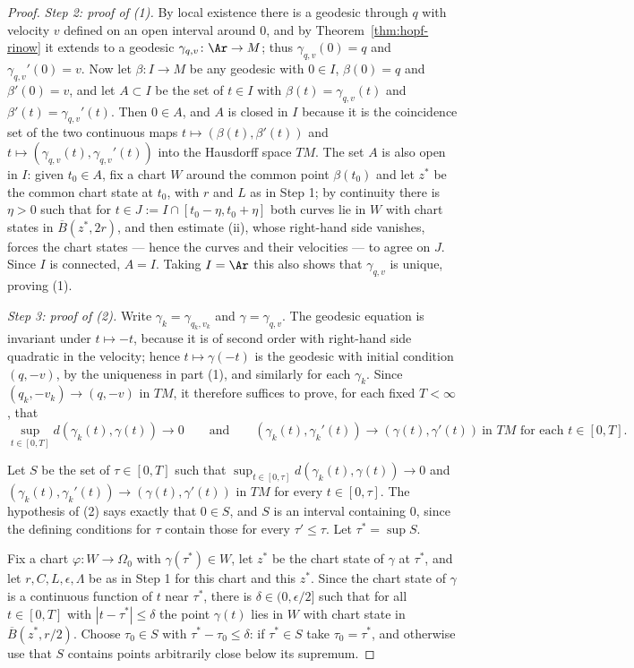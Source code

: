 \begin{proof}
{\em Step 2: proof of (1).} By local existence there is a geodesic
through $q$ with velocity $v$ defined on an open interval around $0$,
and by Theorem~\ref{thm:hopf-rinow} it extends to a geodesic
$\gamma_{q,v}\colon\Ar\to M$; thus $\gamma_{q,v}(0)=q$ and
$\gamma_{q,v}'(0)=v$. Now let $\beta\colon I\to M$ be any geodesic
with $0\in I$, $\beta(0)=q$ and $\beta'(0)=v$, and let $A\subset I$
be the set of $t\in I$ with $\beta(t)=\gamma_{q,v}(t)$ and
$\beta'(t)=\gamma_{q,v}'(t)$. Then $0\in A$, and $A$ is closed in $I$
because it is the coincidence set of the two continuous maps
$t\mapsto(\beta(t),\beta'(t))$ and
$t\mapsto(\gamma_{q,v}(t),\gamma_{q,v}'(t))$ into the Hausdorff space
$TM$. The set $A$ is also open in $I$: given $t_0\in A$, fix a chart
$W$ around the common point $\beta(t_0)$ and let $z^*$ be the common
chart state at $t_0$, with $r$ and $L$ as in Step 1; by continuity
there is $\eta>0$ such that for $t\in J:=I\cap[t_0-\eta,t_0+\eta]$
both curves lie in $W$ with chart states in $\overline{B}(z^*,2r)$,
and then estimate (ii), whose right-hand side vanishes, forces the
chart states --- hence the curves and their velocities --- to agree
on $J$. Since $I$ is connected, $A=I$. Taking $I=\Ar$ this also shows
that $\gamma_{q,v}$ is unique, proving (1).

{\em Step 3: proof of (2).} Write $\gamma_k=\gamma_{q_k,v_k}$ and
$\gamma=\gamma_{q,v}$. The geodesic equation is invariant under
$t\mapsto-t$, because it is of second order with right-hand side
quadratic in the velocity; hence $t\mapsto\gamma(-t)$ is the geodesic
with initial condition $(q,-v)$, by the uniqueness in part (1), and
similarly for each $\gamma_k$. Since $(q_k,-v_k)\rightarrow(q,-v)$ in
$TM$, it therefore suffices to prove, for each fixed $T<\infty$, that
$$\sup_{t\in[0,T]}d(\gamma_k(t),\gamma(t))\rightarrow0
\qquad\text{and}\qquad
(\gamma_k(t),\gamma_k'(t))\rightarrow(\gamma(t),\gamma'(t))
\ \text{in } TM \text{ for each } t\in[0,T].$$

Let $S$ be the set of $\tau\in[0,T]$ such that
$\sup_{t\in[0,\tau]}d(\gamma_k(t),\gamma(t))\rightarrow0$ and
$(\gamma_k(t),\gamma_k'(t))\rightarrow(\gamma(t),\gamma'(t))$ in $TM$
for every $t\in[0,\tau]$. The hypothesis of (2) says exactly that
$0\in S$, and $S$ is an interval containing $0$, since the defining
conditions for $\tau$ contain those for every $\tau'\le\tau$. Let
$\tau^*=\sup S$.

Fix a chart $\varphi\colon W\to\Omega_0$ with $\gamma(\tau^*)\in W$,
let $z^*$ be the chart state of $\gamma$ at $\tau^*$, and let
$r,C,L,\epsilon,\Lambda$ be as in Step 1 for this chart and this
$z^*$. Since the chart state of $\gamma$ is a continuous function of
$t$ near $\tau^*$, there is $\delta\in(0,\epsilon/2]$ such that for
all $t\in[0,T]$ with $|t-\tau^*|\le\delta$ the point $\gamma(t)$ lies
in $W$ with chart state in $\overline{B}(z^*,r/2)$. Choose
$\tau_0\in S$ with $\tau^*-\tau_0\le\delta$: if $\tau^*\in S$ take
$\tau_0=\tau^*$, and otherwise use that $S$ contains points
arbitrarily close below its supremum.


\end{proof}
